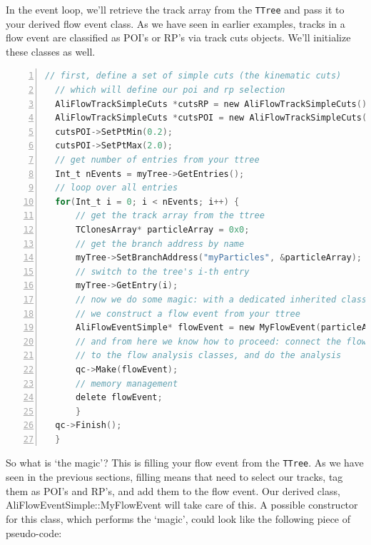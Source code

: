 \documentclass[a4paper]{book}
\numberwithin{equation}{subsection}
\begin{document}
In the event loop, we'll retrieve the track array from the \texttt{TTree} and pass it to your derived flow event class. As we have seen in earlier examples, tracks in a flow event are classified as POI's or RP's via track cuts objects. We'll initialize these classes as well.
\begin{lstlisting}[language=C, numbers=left]
  // first, define a set of simple cuts (the kinematic cuts)
  // which will define our poi and rp selection
  AliFlowTrackSimpleCuts *cutsRP = new AliFlowTrackSimpleCuts();
  AliFlowTrackSimpleCuts *cutsPOI = new AliFlowTrackSimpleCuts();
  cutsPOI->SetPtMin(0.2);
  cutsPOI->SetPtMax(2.0);
  // get number of entries from your ttree
  Int_t nEvents = myTree->GetEntries();
  // loop over all entries
  for(Int_t i = 0; i < nEvents; i++) {
      // get the track array from the ttree
      TClonesArray* particleArray = 0x0;
      // get the branch address by name
      myTree->SetBranchAddress("myParticles", &particleArray);
      // switch to the tree's i-th entry
      myTree->GetEntry(i);
      // now we do some magic: with a dedicated inherited class
      // we construct a flow event from your ttree
      AliFlowEventSimple* flowEvent = new MyFlowEvent(particleArray, cutsPOI, cutsRP);
      // and from here we know how to proceed: connect the flow event
      // to the flow analysis classes, and do the analysis
      qc->Make(flowEvent);
      // memory management
      delete flowEvent;
      }
  qc->Finish();
  }\end{lstlisting}
So what is `the magic'? This is filling your flow event from the \texttt{TTree}. As we have seen in the previous sections, filling means that need to select our tracks, tag them as POI's and RP's, and add them to the flow event. Our derived class, AliFlowEventSimple::MyFlowEvent will take care of this. A possible constructor for this class, which performs the `magic', could look like the following piece of pseudo-code:
\end{document}
